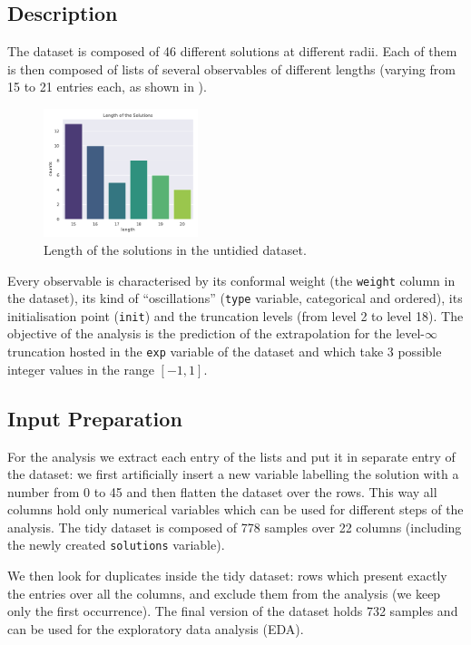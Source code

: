 \subsection{Description}\label{sec:prel:desc}

The dataset is composed of 46 different solutions at different radii. Each of
them is then composed of lists of several observables of different lengths
(varying from 15 to 21 entries each, as shown in ).
\begin{figure}[htbp]
  \centering
  \includegraphics[width=0.4\textwidth]{img/length-solutions}
  \caption{Length of the solutions in the untidied dataset.}
  \label{fig:prelim:length}
\end{figure}
Every observable is characterised by its conformal weight (the \texttt{weight}
column in the dataset), its kind of ``oscillations'' (\texttt{type} variable,
categorical and ordered), its initialisation point (\texttt{init}) and the
truncation levels (from level 2 to level 18).
The objective of the analysis is the prediction of the extrapolation for the
level-$\infty$ truncation hosted in the \texttt{exp} variable of the dataset and which take 3 possible integer values in the range $[-1, 1]$.

\subsection{Input Preparation}\label{sec:prel:prep}

For the analysis we extract each entry of the lists and put it in separate
entry of the dataset: we first artificially insert a new variable labelling the
solution with a number from 0 to 45 and then flatten the dataset over the rows.
This way all columns hold only numerical variables which can be used for
different steps of the analysis.
The tidy dataset is composed of 778 samples over 22 columns (including the
newly created \texttt{solutions} variable).

We then look for duplicates inside the tidy dataset: rows which present exactly
the entries over all the columns, and exclude them from the analysis (we keep
only the first occurrence).
The final version of the dataset holds 732 samples and can be used for the
exploratory data analysis (EDA).

